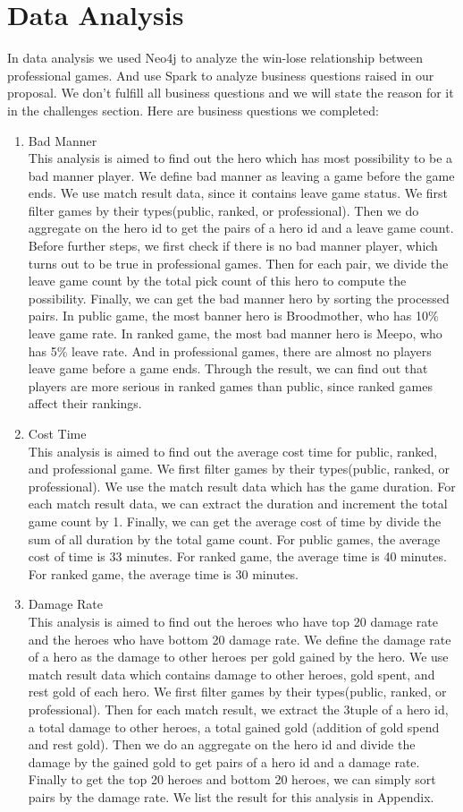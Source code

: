 \documentclass{article}
\begin{document}
\section{Data Analysis}
In data analysis we used Neo4j to analyze the win-lose relationship between professional games. And use Spark to analyze business questions raised in our proposal. We don't fulfill all business questions and we will state the reason for it in the challenges section. Here are business questions we completed:
\begin{enumerate}
    \item Bad Manner \\
    This analysis is aimed to find out the hero which has most possibility to be a bad manner player. We define bad manner as leaving a game before the game ends. We use match result data, since it contains leave game status. We first filter games by their types(public, ranked, or professional). Then we do aggregate on the hero id to get the pairs of a hero id and a leave game count. Before further steps, we first check if there is no bad manner player, which turns out to be true in professional games. Then for each pair, we divide the leave game count by the total pick count of this hero to compute the possibility. Finally, we can get the bad manner hero by sorting the processed pairs. In public game, the most banner hero is Broodmother, who has 10\% leave game rate. In ranked game, the most bad manner hero is Meepo, who has 5\% leave rate. And in professional games, there are almost no players leave game before a game ends. Through the result, we can find out that players are more serious in ranked games than public, since ranked games affect their rankings.
    \item Cost Time \\
    This analysis is aimed to find out the average cost time for public, ranked, and professional game. We first filter games by their types(public, ranked, or professional). We use the match result data which has the game duration. For each match result data, we can extract the duration and increment the total game count by 1. Finally, we can get the average cost of time by divide the sum of all duration by the total game count. For public games, the average cost of time is 33 minutes. For ranked game, the average time is 40 minutes. For ranked game, the average time is 30 minutes.
    \item Damage Rate \\
    This analysis is aimed to find out the heroes who have top 20 damage rate and the heroes who have bottom 20 damage rate. We define the damage rate of a hero as the damage to other heroes per gold gained by the hero. We use match result data which contains damage to other heroes, gold spent, and rest gold of each hero.  We first filter games by their types(public, ranked, or professional). Then for each match result, we extract the 3tuple of a hero id, a total damage to other heroes, a total gained gold (addition of gold spend and rest gold). Then we do an aggregate on the hero id and divide the damage by the gained gold to get pairs of a hero id and a damage rate. Finally to get the top 20 heroes and bottom 20 heroes, we can simply sort pairs by the damage rate. We list the result for this analysis in Appendix.

\end{enumerate}
\end{document}
